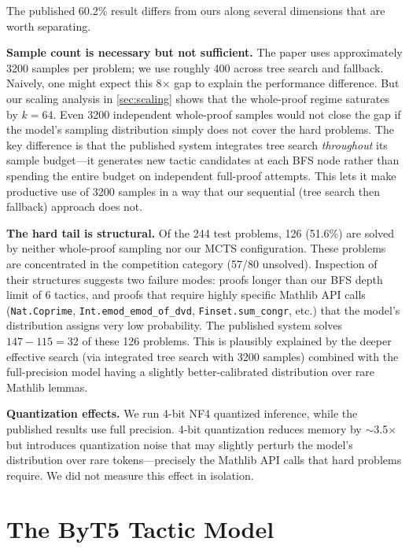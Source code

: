 \documentclass[openany, amssymb, psamsfonts]{amsart}
\theoremstyle{definition}
\numberwithin{equation}{section}
\begin{document}
The published 60.2\% result \cite{deepseek} differs from ours along several
dimensions that are worth separating.

\textbf{Sample count is necessary but not sufficient.}
The paper uses approximately 3200 samples per problem; we use roughly 400
across tree search and fallback.
Naively, one might expect this 8$\times$ gap to explain the performance
difference.
But our scaling analysis in \autoref{sec:scaling} shows that the whole-proof
regime saturates by $k=64$.
Even 3200 independent whole-proof samples would not close the gap if the
model's sampling distribution simply does not cover the hard problems.
The key difference is that the published system integrates tree search
\emph{throughout} its sample budget---it generates new tactic candidates at
each BFS node rather than spending the entire budget on independent
full-proof attempts.
This lets it make productive use of 3200 samples in a way that our
sequential (tree search then fallback) approach does not.

\textbf{The hard tail is structural.}
Of the 244 test problems, 126 (51.6\%) are solved by neither whole-proof
sampling nor our MCTS configuration.
These problems are concentrated in the competition category (57/80 unsolved).
Inspection of their structures suggests two failure modes: proofs longer
than our BFS depth limit of 6 tactics, and proofs that require highly
specific Mathlib API calls (\texttt{Nat.Coprime}, \texttt{Int.emod\_emod\_of\_dvd},
\texttt{Finset.sum\_congr}, etc.) that the model's distribution assigns very
low probability.
The published system solves $147 - 115 = 32$ of these 126 problems.
This is plausibly explained by the deeper effective search (via integrated tree
search with 3200 samples) combined with the full-precision model having a
slightly better-calibrated distribution over rare Mathlib lemmas.

\textbf{Quantization effects.}
We run 4-bit NF4 quantized inference, while the published results use
full precision.
4-bit quantization reduces memory by $\sim$3.5$\times$ but introduces
quantization noise that may slightly perturb the model's distribution
over rare tokens---precisely the Mathlib API calls that hard problems require.
We did not measure this effect in isolation.

\section{The ByT5 Tactic Model}
\label{sec:byt5}
\end{document}
